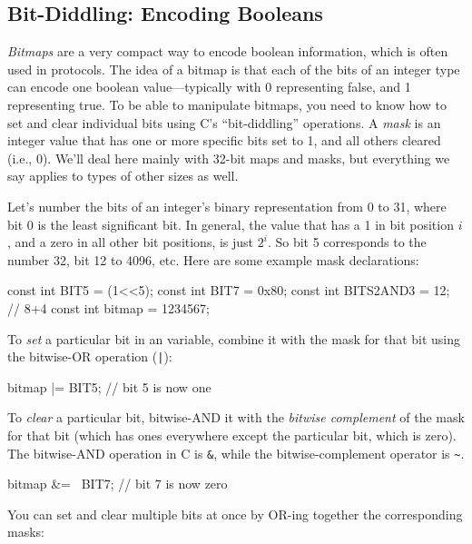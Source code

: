 \subsection{Bit-Diddling: Encoding Booleans}
\label{sect:bitdiddling}

\emph{Bitmaps} are a very compact way to encode boolean information,
which is often used in protocols.  The idea of a bitmap is that each
of the bits of an integer type can encode one boolean
value---typically with 0 representing false, and 1 representing true.
To be able to manipulate bitmaps, you need to know how to set and
clear individual bits using C's ``bit-diddling'' operations.  A
\emph{mask} is an integer value that has one or more specific bits set
to 1, and all others cleared (i.e., 0).  We'll deal here mainly with
32-bit maps and masks, but everything we say
applies to types of other sizes as well.

Let's number the bits of an integer's binary representation from 0 to 31,
where bit 0 is the least significant bit.  In general, the 
value that has a 1 in bit position $i$, and a zero in all other bit
positions, is just $2^i$.  So bit 5 corresponds to the number 32,
bit 12 to 4096, etc.  Here are some example mask declarations:

\begin{inlinecode}
const int BIT5 = (1<<5);
const int BIT7 = 0x80;
const int BITS2AND3 = 12;   // 8+4
const int bitmap = 1234567;
\end{inlinecode}

\noindent To \emph{set\/} a particular bit in an  variable,
combine it with the mask for that bit using the bitwise-OR operation
(\verb+|+):

\begin{inlinecode}
bitmap |= BIT5;
// bit 5 is now one
\end{inlinecode}

\noindent To \emph{clear\/} a particular bit, bitwise-AND it with the
\emph{bitwise complement} of the mask for that bit (which has ones
everywhere except the particular bit, which is zero).  The bitwise-AND
operation in C is \verb+&+, while the bitwise-complement operator
is \verb+~+.

\begin{inlinecode}
bitmap &= ~BIT7;
// bit 7 is now zero
\end{inlinecode}

\noindent You can set and clear multiple bits at once by OR-ing
together the corresponding masks:


